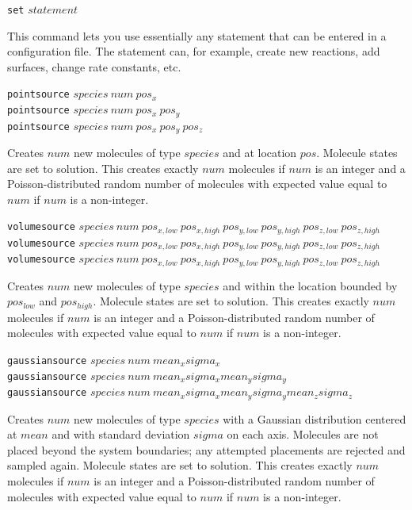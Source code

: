 \documentclass {scrbook}
\newcommand {\ttt} {\texttt}
\begin{document}
\begin{description}

\item{\ttt{set} $statement$}

This command lets you use essentially any statement that can be entered in a configuration file. The statement can, for example, create new reactions, add surfaces, change rate constants, etc.

\item{\ttt{pointsource} $species\ num\ pos_x$\\
\ttt{pointsource} $species\ num\ pos_x\ pos_y$\\
\ttt{pointsource} $species\ num\ pos_x\ pos_y\ pos_z$}

Creates $num$ new molecules of type $species$ and at location $pos$. Molecule states are set to solution. This creates exactly $num$ molecules if $num$ is an integer and a Poisson-distributed random number of molecules with expected value equal to $num$ if $num$ is a non-integer.

\item{\ttt{volumesource} $species\ num\ pos_{x,low}\ pos_{x,high}\ pos_{y,low}\ pos_{y,high}\ pos_{z,low}\ pos_{z,high}$\\
\ttt{volumesource} $species\ num\ pos_{x,low}\ pos_{x,high}\ pos_{y,low}\ pos_{y,high}\ pos_{z,low}\ pos_{z,high}$\\
\ttt{volumesource} $species\ num\ pos_{x,low}\ pos_{x,high}\ pos_{y,low}\ pos_{y,high}\ pos_{z,low}\ pos_{z,high}$}

Creates $num$ new molecules of type $species$ and within the location bounded by $pos_{low}$ and $pos_{high}$. Molecule states are set to solution. This creates exactly $num$ molecules if $num$ is an integer and a Poisson-distributed random number of molecules with expected value equal to $num$ if $num$ is a non-integer.

\item{\ttt{gaussiansource} $species\ num\ mean_x sigma_x$\\
\ttt{gaussiansource} $species\ num\ mean_x sigma_x mean_y sigma_y$\\
\ttt{gaussiansource} $species\ num\ mean_x sigma_x mean_y sigma_y mean_z sigma_z$}

Creates $num$ new molecules of type $species$ with a Gaussian distribution centered at $mean$ and with standard deviation $sigma$ on each axis. Molecules are not placed beyond the system boundaries; any attempted placements are rejected and sampled again. Molecule states are set to solution. This creates exactly $num$ molecules if $num$ is an integer and a Poisson-distributed random number of molecules with expected value equal to $num$ if $num$ is a non-integer.


\end{description}
\end{document}
